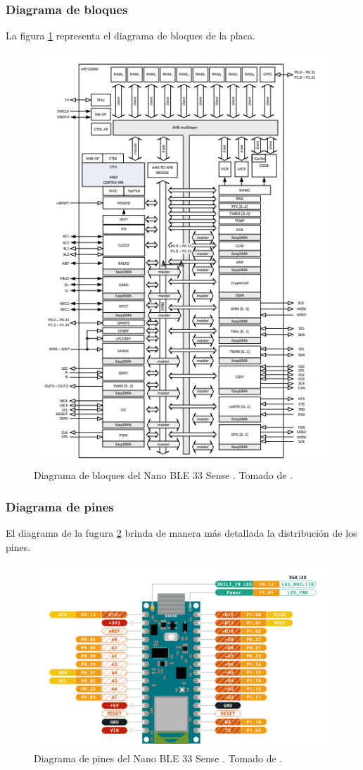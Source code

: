 \subsubsection*{Diagrama de bloques}
La figura \ref{fig1} representa el diagrama de bloques de la placa.
\begin{figure}[H]
\centering
\includegraphics[width=.55\linewidth]{Imagenes/1.png}
 \caption{Diagrama de bloques del Nano BLE 33 Sense . Tomado de \cite{web}.}
 \label{fig1}
\end{figure}
\newpage
\subsubsection*{Diagrama de pines}
El diagrama de la fugura \ref{fig2} brinda de manera más detallada la distribución de los pines.
\begin{figure}[H]
\centering
\includegraphics[width=.55\linewidth]{Imagenes/2.png}
 \caption{Diagrama de pines del Nano BLE 33 Sense . Tomado de \cite{web2}.}
 \label{fig2}
\end{figure}
